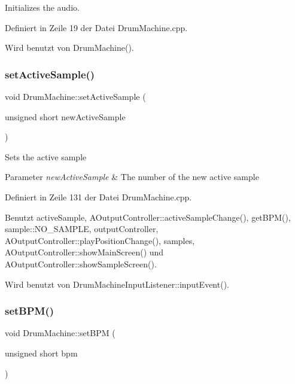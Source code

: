 Initializes the audio. 



Definiert in Zeile 19 der Datei Drum\+Machine.\+cpp.



Wird benutzt von Drum\+Machine().

\mbox{\label{class_drum_machine_a1b6ff2afd815b9981e8a008c857c1847}} 
\subsubsection{\texorpdfstring{set\+Active\+Sample()}{setActiveSample()}}
{\footnotesize\ttfamily void Drum\+Machine\+::set\+Active\+Sample (\begin{DoxyParamCaption}\item[{unsigned short}]{new\+Active\+Sample }\end{DoxyParamCaption})}

Sets the active sample 
\begin{DoxyParams}{Parameter}
{\em new\+Active\+Sample} & The number of the new active sample \\
\hline
\end{DoxyParams}


Definiert in Zeile 131 der Datei Drum\+Machine.\+cpp.



Benutzt active\+Sample, A\+Output\+Controller\+::active\+Sample\+Change(), get\+B\+P\+M(), sample\+::\+N\+O\+\_\+\+S\+A\+M\+P\+LE, output\+Controller, A\+Output\+Controller\+::play\+Position\+Change(), samples, A\+Output\+Controller\+::show\+Main\+Screen() und A\+Output\+Controller\+::show\+Sample\+Screen().



Wird benutzt von Drum\+Machine\+Input\+Listener\+::input\+Event().

\mbox{\label{class_drum_machine_aac554a614388d11543698f407b0e11e6}} 
\subsubsection{\texorpdfstring{set\+B\+P\+M()}{setBPM()}}
{\footnotesize\ttfamily void Drum\+Machine\+::set\+B\+PM (\begin{DoxyParamCaption}\item[{unsigned short}]{bpm }\end{DoxyParamCaption})}

